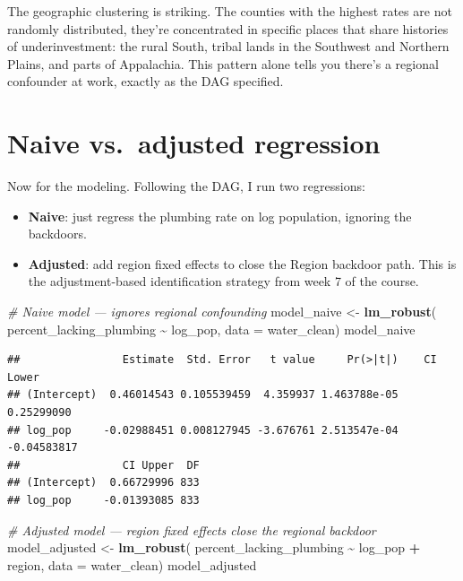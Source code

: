 \documentclass[
]{article}
\newenvironment{Shaded}{\begin{snugshade}}{\end{snugshade}}
\newcommand{\AttributeTok}[1]{\textcolor[rgb]{0.13,0.29,0.53}{#1}}
\newcommand{\CommentTok}[1]{\textcolor[rgb]{0.56,0.35,0.01}{\textit{#1}}}
\newcommand{\FunctionTok}[1]{\textcolor[rgb]{0.13,0.29,0.53}{\textbf{#1}}}
\newcommand{\NormalTok}[1]{#1}
\newcommand{\OtherTok}[1]{\textcolor[rgb]{0.56,0.35,0.01}{#1}}
\newcommand{\SpecialCharTok}[1]{\textcolor[rgb]{0.81,0.36,0.00}{\textbf{#1}}}
\providecommand{\tightlist}{%
  \setlength{\itemsep}{0pt}\setlength{\parskip}{0pt}}
\begin{document}
The geographic clustering is striking. The counties with the highest
rates are not randomly distributed, they're concentrated in specific
places that share histories of underinvestment: the rural South, tribal
lands in the Southwest and Northern Plains, and parts of Appalachia.
This pattern alone tells you there's a regional confounder at work,
exactly as the DAG specified.

\section{Naive vs.~adjusted
regression}\label{naive-vs.-adjusted-regression}

Now for the modeling. Following the DAG, I run two regressions:

\begin{itemize}
\tightlist
\item
  \textbf{Naive}: just regress the plumbing rate on log population,
  ignoring the backdoors.
\item
  \textbf{Adjusted}: add region fixed effects to close the Region
  backdoor path. This is the adjustment-based identification strategy
  from week 7 of the course.
\end{itemize}

\begin{Shaded}
\begin{Highlighting}[]
\CommentTok{\# Naive model — ignores regional confounding}
\NormalTok{model\_naive }\OtherTok{\textless{}{-}} \FunctionTok{lm\_robust}\NormalTok{(}
\NormalTok{  percent\_lacking\_plumbing }\SpecialCharTok{\textasciitilde{}}\NormalTok{ log\_pop,}
  \AttributeTok{data =}\NormalTok{ water\_clean)}
\NormalTok{model\_naive}
\end{Highlighting}
\end{Shaded}

\begin{verbatim}
##                Estimate  Std. Error   t value     Pr(>|t|)    CI Lower
## (Intercept)  0.46014543 0.105539459  4.359937 1.463788e-05  0.25299090
## log_pop     -0.02988451 0.008127945 -3.676761 2.513547e-04 -0.04583817
##                CI Upper  DF
## (Intercept)  0.66729996 833
## log_pop     -0.01393085 833
\end{verbatim}

\begin{Shaded}
\begin{Highlighting}[]
\CommentTok{\# Adjusted model — region fixed effects close the regional backdoor}
\NormalTok{model\_adjusted }\OtherTok{\textless{}{-}} \FunctionTok{lm\_robust}\NormalTok{(}
\NormalTok{  percent\_lacking\_plumbing }\SpecialCharTok{\textasciitilde{}}\NormalTok{ log\_pop }\SpecialCharTok{+}\NormalTok{ region,}
  \AttributeTok{data =}\NormalTok{ water\_clean)}
\NormalTok{model\_adjusted}
\end{Highlighting}
\end{Shaded}
\end{document}
